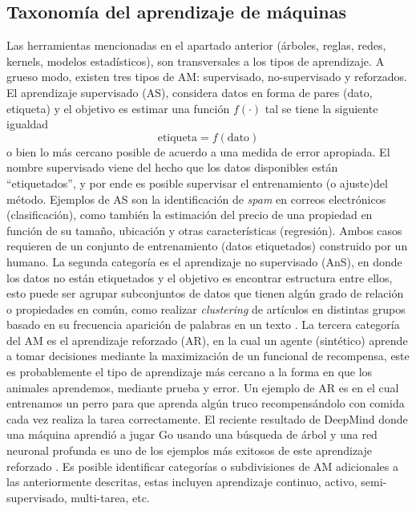 \subsection{Taxonomía del aprendizaje de máquinas}

Las herramientas mencionadas en el apartado anterior (árboles, reglas, redes, kernels, modelos estadísticos), son transversales a los tipos de aprendizaje. A grueso modo, existen tres tipos de AM: supervisado, no-supervisado y reforzados. El aprendizaje supervisado (AS), considera  datos en forma de pares (dato, etiqueta) y el objetivo es estimar una función $f(\cdot)$ tal se tiene la siguiente igualdad  
\begin{equation}
	\text{etiqueta} = f(\text{dato})
\end{equation}
o bien lo más cercano posible de acuerdo a una medida de error apropiada. El nombre supervisado viene del hecho que los datos disponibles están “etiquetados”, y por ende es posible supervisar el entrenamiento (o ajuste)del método. Ejemplos de AS son la identificación de \emph{spam} en  correos electrónicos (clasificación), como también la estimación del precio de una propiedad en función de su tamaño, ubicación y otras características (regresión). Ambos casos requieren de un conjunto de entrenamiento (datos etiquetados) construido por un humano. La segunda categoría es el aprendizaje no supervisado (AnS), en donde los datos no están etiquetados y el objetivo es encontrar estructura entre ellos, esto puede ser agrupar subconjuntos de datos que tienen algún grado de relación o propiedades en común, como realizar \emph{clustering} de artículos en distintas grupos basado en su frecuencia aparición de palabras en un texto \cite{salakhutdinov_2006}. La tercera categoría del AM es el aprendizaje reforzado (AR), en la cual un agente (sintético) aprende a tomar decisiones mediante la maximización de un funcional de recompensa, este es probablemente el tipo de aprendizaje más cercano a la forma en que los animales aprendemos, mediante prueba y error. Un ejemplo de AR es en el cual entrenamos un perro para que aprenda algún truco recompensándolo con comida cada vez realiza la tarea correctamente. El reciente resultado de DeepMind donde una máquina aprendió a jugar Go usando una búsqueda de árbol y una red neuronal profunda es uno de los ejemplos más exitosos de este aprendizaje reforzado \cite{silver_2016}. Es posible identificar categorías o subdivisiones de AM adicionales a las anteriormente descritas, estas incluyen aprendizaje continuo, activo, semi-supervisado, multi-tarea, etc. 



